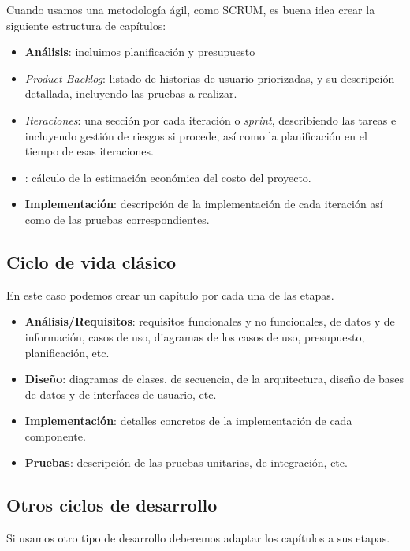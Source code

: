 Cuando usamos una metodología ágil, como SCRUM, es buena idea crear la siguiente estructura de capítulos:
\begin{itemize}
    \item \textbf{Análisis}: incluimos planificación y presupuesto
    \item \textit{Product Backlog}: listado de historias de usuario priorizadas, y su descripción detallada, incluyendo las pruebas a realizar.
    \item \textit{Iteraciones}: una sección por cada iteración o \textit{sprint}, describiendo las tareas e incluyendo gestión de riesgos si procede, así como la planificación en el tiempo de esas iteraciones.
    \item {}: cálculo de la estimación económica del costo del proyecto.
    \item \textbf{Implementación}: descripción de la implementación de cada iteración así como de las pruebas correspondientes. 
    
\end{itemize}
                

\subsection{Ciclo de vida clásico}
En este caso podemos crear un capítulo por cada una de las etapas.
                \begin{itemize}
                    \item \textbf{Análisis/Requisitos}: requisitos funcionales y no funcionales, de datos y de información, casos de uso, diagramas de los casos de uso, presupuesto, planificación, etc.
                    \item \textbf{Diseño}: diagramas de clases, de secuencia, de la arquitectura, diseño de bases de datos y de interfaces de usuario, etc.
                    \item \textbf{Implementación}: detalles concretos de la implementación de cada componente.
                    \item \textbf{Pruebas}: descripción de las pruebas unitarias, de integración, etc.
                \end{itemize}
\subsection{Otros ciclos de desarrollo}
Si usamos otro tipo de desarrollo deberemos adaptar los capítulos a sus etapas.

